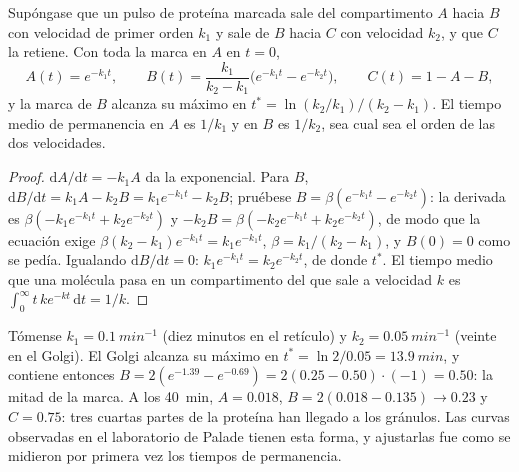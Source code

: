 \begin{theorem}\label{thm:b3:membrane-traffic:pulse-chase}
Supóngase que un pulso de proteína marcada sale del compartimento $A$
hacia $B$ con velocidad de primer orden $k_{1}$ y sale de $B$ hacia $C$
con velocidad $k_{2}$, y que $C$ la retiene. Con toda la marca en $A$ en
$t = 0$,
\[
A(t) = e^{-k_{1}t},\qquad
B(t) = \frac{k_{1}}{k_{2} - k_{1}}\bigl(e^{-k_{1}t} - e^{-k_{2}t}\bigr),
\qquad
C(t) = 1 - A - B,
\]
y la marca de $B$ alcanza su máximo en
$t^{*} = \ln(k_{2}/k_{1})/(k_{2} - k_{1})$. El tiempo medio de
permanencia en $A$ es $1/k_{1}$ y en $B$ es $1/k_{2}$, sea cual sea el
orden de las dos velocidades.
\end{theorem}
\begin{proof}
$\mathrm{d}A/\mathrm{d}t = -k_{1}A$ da la exponencial. Para $B$,
$\mathrm{d}B/\mathrm{d}t = k_{1}A - k_{2}B = k_{1}e^{-k_{1}t} - k_{2}B$;
pruébese $B = \beta(e^{-k_{1}t} - e^{-k_{2}t})$: la derivada es
$\beta(-k_{1}e^{-k_{1}t} + k_{2}e^{-k_{2}t})$ y $-k_{2}B = \beta(-k_{2}
e^{-k_{1}t} + k_{2}e^{-k_{2}t})$, de modo que la ecuación exige $\beta(k_{2}
- k_{1})e^{-k_{1}t} = k_{1}e^{-k_{1}t}$, $\beta = k_{1}/(k_{2} -
k_{1})$, y $B(0) = 0$ como se pedía. Igualando
$\mathrm{d}B/\mathrm{d}t =
0$: $k_{1}e^{-k_{1}t} = k_{2}e^{-k_{2}t}$, de donde $t^{*}$. El tiempo
medio que una molécula pasa en un compartimento del que sale a velocidad
$k$ es $\int_{0}^{
\infty} t\,k e^{-kt}\,\mathrm{d}t = 1/k$.
\end{proof}

\begin{example}\label{ex:b3:membrane-traffic:palade}
Tómense $k_{1} = \qty{0.1}{min^{-1}}$ (diez minutos en el retículo) y
$k_{2} = \qty{0.05}{min^{-1}}$ (veinte en el Golgi). El Golgi alcanza su
máximo en $t^{*} = \ln 2/0.05 = \qty{13.9}{min}$, y contiene entonces
$B = 2(e^{-1.39} -
e^{-0.69}) = 2(0.25 - 0.50)\cdot(-1) = 0.50$: la mitad de la marca. A los
\qty{40}{min}, $A = 0.018$, $B = 2(0.018 - 0.135) \to 0.23$ y $C = 0.75$:
tres cuartas partes de la proteína han llegado a los gránulos. Las curvas
observadas en el laboratorio de Palade tienen esta forma, y ajustarlas
fue como se midieron por primera vez los tiempos de permanencia.
\end{example}

